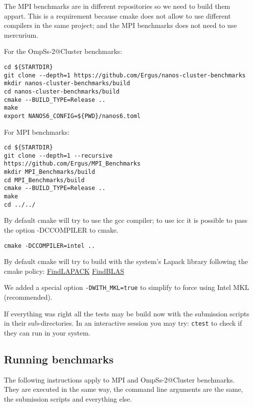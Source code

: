 \documentclass{article}
\newcommand{\code}[1]{\texttt{#1}}
\begin{document}
The MPI benchmarks are in different repositories so we need to build
them appart. This is a requirement because cmake does not allow to use
different compilers in the same project; and the MPI benchmarks does
not need to use mercurium.

For the OmpSs-2@Cluster benchmarks:

\begin{lstlisting}
cd ${STARTDIR}
git clone --depth=1 https://github.com/Ergus/nanos-cluster-benchmarks
mkdir nanos-cluster-benchmarks/build
cd nanos-cluster-benchmarks/build
cmake --BUILD_TYPE=Release ..
make
export NANOS6_CONFIG=${PWD}/nanos6.toml
\end{lstlisting}

For MPI benchmarks:

\begin{lstlisting}
cd ${STARTDIR}
git clone --depth=1 --recursive https://github.com/Ergus/MPI_Benchmarks
mkdir MPI_Benchmarks/build
cd MPI_Benchmarks/build
cmake --BUILD_TYPE=Release ..
make
cd ../../
\end{lstlisting}

By default cmake will try to use the gcc compiler; to use icc it is
possible to pass the option -DCCOMPILER to cmake.

\begin{lstlisting}
cmake -DCCOMPILER=intel ..
\end{lstlisting}

By default cmake will try to build with the system's Lapack library
following the cmake policy:
\href{https://cmake.org/cmake/help/latest/module/FindLAPACK.html}{FindLAPACK}
\href{https://cmake.org/cmake/help/latest/module/FindBLAS.html}{FindBLAS}

We added a special option \code{-DWITH\_MKL=true} to simplify to force
using Intel MKL (recommended).

If everything was right all the tests may be build now with the
submission scripts in their sub-directories. In an interactive session
you may try: \code{ctest} to check if they can run in your system.

\subsection{Running benchmarks}

The following instructions apply to MPI and OmpSs-2@Cluster
benchmarks.  They are executed in the same way, the command line
arguments are the same, the submission scripts and everything else.
\end{document}
